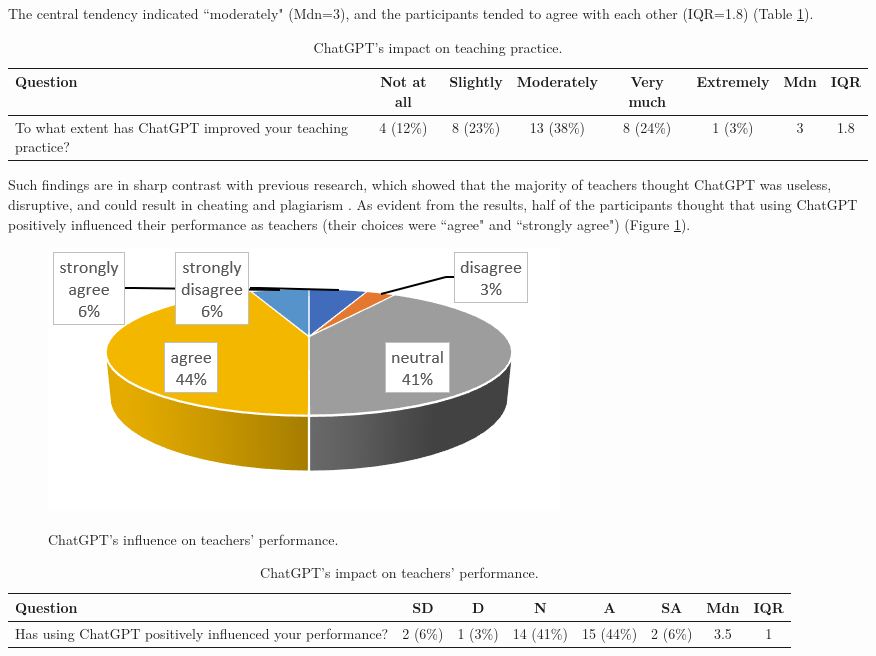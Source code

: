 \documentclass[english]{textolivre}
\begin{document}
The central tendency indicated ``moderately" (Mdn=3), and the participants tended to agree with each other (IQR=1.8) (Table \ref{tab-3}).

\begin{table}[h!]
\centering
\caption{ChatGPT’s impact on teaching practice.}\label{tab-3}
\begin{tabularx}{\textwidth}{@{}Xccccc cc@{}}
\toprule
Question & Not at all & Slightly & Moderately & Very much & Extremely & Mdn & IQR \\
\midrule
To what extent has ChatGPT improved your teaching practice? & 4 (12\%) & 8 (23\%) & 13 (38\%) & 8 (24\%) & 1 (3\%) & 3 & 1.8 \\
\bottomrule
\end{tabularx}
\end{table}


Such findings are in sharp contrast with previous research, which showed that the majority of teachers thought ChatGPT was useless, disruptive, and could result in cheating and plagiarism \cite[p. 103]{iqbal2023}. As evident from the results, half of the participants thought that using ChatGPT positively influenced their performance as teachers (their choices were ``agree" and ``strongly agree") (Figure \ref{fig-8}).

\begin{figure}[h!]
    \centering
    \begin{minipage}{0.65\linewidth}
    \includegraphics[width=\linewidth]{Imagens/Figure8.png}
    \caption{ChatGPT’s influence on teachers’ performance.}\label{tab-4}
    \label{fig-8}
    \end{minipage}
\end{figure}

\begin{table}[h!]
\centering
\caption{ChatGPT’s impact on teachers’ performance.}
\begin{tabularx}{\textwidth}{@{}Xccccc cc@{}}
\toprule
Question & SD & D & N & A & SA & Mdn & IQR \\
\midrule
Has using ChatGPT positively influenced your performance? & 2 (6\%) & 1 (3\%) & 14 (41\%) & 15 (44\%) & 2 (6\%) & 3.5 & 1 \\
\bottomrule
\end{tabularx}
\end{table}
\end{document}
